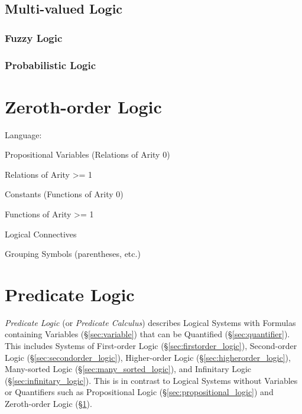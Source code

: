 \subsection{Multi-valued Logic}\label{sec:multi_valued_logic}

\subsubsection{Fuzzy Logic}\label{sec:fuzzy_logic}

\subsubsection{Probabilistic Logic}\label{sec:probabilistic_logic}



\section{Zeroth-order Logic}\label{sec:zerothorder_logic}


Language:

Propositional Variables (Relations of Arity 0)

Relations of Arity >= 1

Constants (Functions of Arity 0)

Functions of Arity >= 1

Logical Connectives

Grouping Symbols (parentheses, etc.)



\section{Predicate Logic}\label{sec:predicate_logic}

\emph{Predicate Logic} (or \emph{Predicate Calculus}) describes
Logical Systems with Formulas containing Variables
(\S\ref{sec:variable}) that can be Quantified
(\S\ref{sec:quantifier}). This includes Systems of First-order Logic
(\S\ref{sec:firstorder_logic}), Second-order Logic
(\S\ref{sec:secondorder_logic}), Higher-order Logic
(\S\ref{sec:higherorder_logic}), Many-sorted Logic
(\S\ref{sec:many_sorted_logic}), and Infinitary Logic
(\S\ref{sec:infinitary_logic}). This is in contrast to Logical Systems
without Variables or Quantifiers such as Propositional Logic
(\S\ref{sec:propositional_logic}) and Zeroth-order Logic
(\S\ref{sec:zerothorder_logic}).



